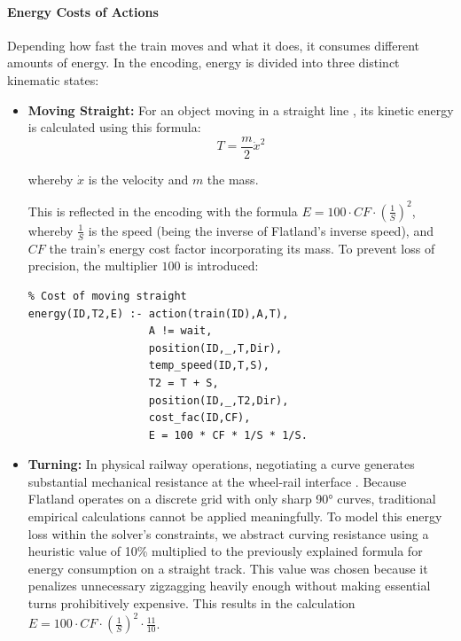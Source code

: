 \paragraph{Energy Costs of Actions}
Depending how fast the train moves and what it does, it consumes different amounts of energy. In the encoding, energy is divided into three distinct kinematic states:
\begin{itemize}
  \item \textbf{Moving Straight:} For an object moving in a straight line \cite[p.~169]{nolting_grundkurs_2006}, its kinetic energy is calculated using this formula:
  \begin{equation}
  \label{eq:kinetic_energy}
  T = \frac{m}{2} \dot{x}^2 
  \end{equation}
  
  whereby $\dot{x}$ is the velocity and $m$ the mass.
  
    This is reflected in the encoding with the formula $E = 100 \cdot CF \cdot \left(\frac{1}{S}\right)^2$, whereby $\frac{1}{S}$ is the speed (being the inverse of Flatland's inverse speed), and $CF$ the train's energy cost factor incorporating its mass.
  To prevent loss of precision, the multiplier $100$ is introduced:
  
  \begin{verbatim}
% Cost of moving straight
energy(ID,T2,E) :- action(train(ID),A,T),
                   A != wait,
                   position(ID,_,T,Dir),
                   temp_speed(ID,T,S),
                   T2 = T + S,
                   position(ID,_,T2,Dir),
                   cost_fac(ID,CF),
                   E = 100 * CF * 1/S * 1/S.
  \end{verbatim}
  \item \textbf{Turning:} In physical railway operations, negotiating a curve generates substantial mechanical resistance at the wheel-rail interface \cite[p.~2--3]{wu_curving_2022}. Because Flatland operates on a discrete grid with only sharp 90° curves, traditional empirical calculations cannot be applied meaningfully. To model this energy loss within the solver's constraints, we abstract curving resistance using a heuristic value of 10\% multiplied to the previously explained formula for energy consumption on a straight track. This value was chosen because it penalizes unnecessary zigzagging heavily enough without making essential turns prohibitively expensive. This results in the calculation $E = 100 \cdot CF \cdot \left(\frac{1}{S}\right)^2 \cdot \frac{11}{10}$.
  \begin{verbatim}


\end{verbatim}
\end{itemize}
